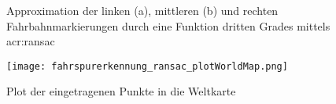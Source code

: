 \begin{figure}[H] %
  \centering
  \quad
  \quad
  \caption{Approximation der linken (a), mittleren (b) und rechten Fahrbahnmarkierungen durch eine Funktion dritten Grades mittels \gls{acr:ransac}}
\label{fig:fahrspurerkennung_ransac_ransac}
\end{figure} 

\begin{figure}[H] %
  \centering
  \texttt{[image: fahrspurerkennung\_ransac\_plotWorldMap.png]}
  \caption{Plot der eingetragenen Punkte in die Weltkarte}
\label{fig:fahrspurerkennung_ransac_karte}
\end{figure} 

